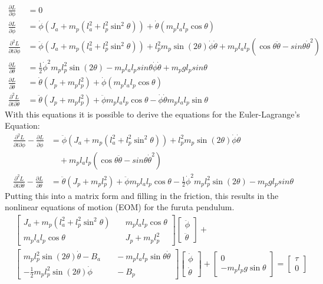 \begin{align*}
	\frac{\partial L}{\partial \phi}&=0\\
	\frac{\partial L}{\partial 
	\dot{\phi}}&=\dot{\phi}(J_a+m_p(l_a^2+l_p^2\sin^2\theta))+\dot{\theta}(
	m_pl_al_p\cos\theta)\\
	\frac{\partial^2 L}{\partial t \partial \dot{\phi}}&= 
	\ddot{\phi}(J_a+m_p(l_a^2+l_p^2\sin^2 \theta))+l_p^2m_p\sin(2\theta)
	\dot{\phi}\dot{\theta}+m_pl_al_p(\cos 
	\theta\ddot{\theta}-sin\theta \dot{\theta}^2)\\
	\frac{\partial L}{\partial 
	\theta}&=\frac{1}{2}\dot{\phi}^2m_pl_p^2\sin(2\theta)-m_pl_al_psin\theta\dot{\phi}
	\dot{\theta}+m_pgl_psin\theta\\
	\frac{\partial L}{\partial 
		\dot{\theta}}&=\dot{\theta}(J_p+m_pl_p^2)+\dot{\phi}(m_pl_al_p\cos\theta)\\
	\frac{\partial^2 L}{\partial t \partial 
	\dot{\theta}}&=\ddot{\theta}(J_p+m_pl_p^2)+\ddot{\phi}m_pl_al_p\cos\theta-\dot{\phi}
	\dot{\theta}m_pl_al_p\sin\theta
\end{align*}
With this equations it is possible to derive the equations for the 
Euler-Lagrange's Equation:
\begin{align*}
\frac{\partial^2 L}{\partial t\partial\dot{\phi}}-\frac{\partial 
L}{\partial\dot{\phi}}&=\ddot{\phi}(J_a+m_p(l_a^2+l_p^2\sin^2 
\theta))+l_p^2m_p\sin(2\theta)
\dot{\phi}\dot{\theta}\\ &\quad + m_pl_al_p(\cos 
\theta\ddot{\theta}-sin\theta \dot{\theta}^2)\\
\frac{\partial^2 L}{\partial t\partial\dot{\theta}}-\frac{\partial 
L}{\partial\dot{\theta}}&=\ddot{\theta}(J_p+m_pl_p^2)+\ddot{\phi}m_pl_al_p\cos\theta-\frac{1}{2}\dot{\phi}^2m_pl_p^2\sin(2\theta)-m_pgl_psin\theta
\end{align*}
Putting this into a matrix form and filling in the friction, this results in 
the nonlinear equations of motion (EOM) for the furuta pendulum.
\begin{align*}
&\begin{bmatrix}
J_a+m_p(l_a^2+l_p^2\sin^2\theta)& \quad m_pl_al_p\cos\theta \\ 
m_pl_al_p\cos\theta& \quad J_p+m_pl_p^2 
\end{bmatrix} 
\begin{bmatrix}
\ddot{\phi}\\
\ddot{\theta}
\end{bmatrix} + \\
&\begin{bmatrix}
m_pl_p^2\sin(2\theta)\dot{\theta}- B_a& \quad -m_pl_al_p\sin \theta 
\dot{\theta}\\
-\frac{1}{2}m_pl_p^2\sin(2\theta)\dot{\phi} &\quad -B_p
\end{bmatrix}
\begin{bmatrix}
\dot{\phi}\\
\dot{\theta}
\end{bmatrix} +
\begin{bmatrix}
0\\
-m_pl_pg\sin\theta
\end{bmatrix}=\begin{bmatrix}
\tau \\
0
\end{bmatrix}
\end{align*}

